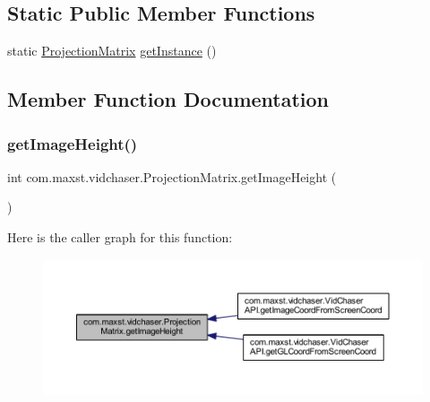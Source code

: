 \subsection*{Static Public Member Functions}
\begin{DoxyCompactItemize}
\item 
static \hyperlink{classcom_1_1maxst_1_1vidchaser_1_1_projection_matrix}{Projection\+Matrix} \hyperlink{classcom_1_1maxst_1_1vidchaser_1_1_projection_matrix_afb7c50dffd1d73e23680af04b5ba5a04}{get\+Instance} ()
\end{DoxyCompactItemize}


\subsection{Member Function Documentation}
\mbox{\label{classcom_1_1maxst_1_1vidchaser_1_1_projection_matrix_a72e65465d3d38d1ef4f6bf187e72bf71}} 
\subsubsection{\texorpdfstring{get\+Image\+Height()}{getImageHeight()}}
{\footnotesize\ttfamily int com.\+maxst.\+vidchaser.\+Projection\+Matrix.\+get\+Image\+Height (\begin{DoxyParamCaption}{ }\end{DoxyParamCaption})}

Here is the caller graph for this function\+:\nopagebreak
\begin{figure}[H]
\begin{center}
\leavevmode
\includegraphics[width=350pt]{classcom_1_1maxst_1_1vidchaser_1_1_projection_matrix_a72e65465d3d38d1ef4f6bf187e72bf71_icgraph}
\end{center}
\end{figure}
\mbox{\label{classcom_1_1maxst_1_1vidchaser_1_1_projection_matrix_a1e07354294afffdb44a61c7b7659e1fa}} 
